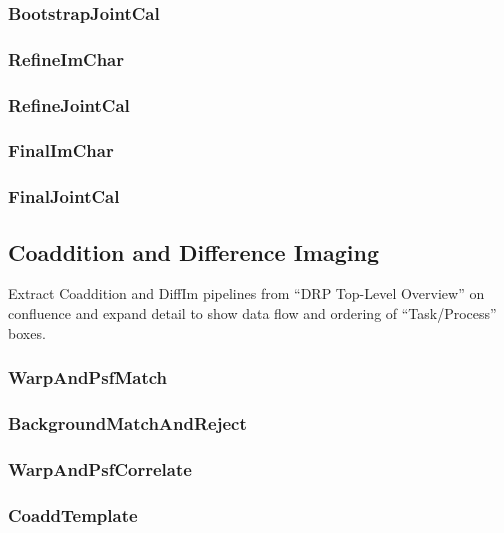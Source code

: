 \subsubsection{BootstrapJointCal}
\label{sec:drpBootstrapJointCal}
\subsubsection{RefineImChar}
\label{sec:drpRefineImChar}
\subsubsection{RefineJointCal}
\label{sec:drpRefineJointCal}
\subsubsection{FinalImChar}
\label{sec:drpFinalImChar}
\subsubsection{FinalJointCal}
\label{sec:drpFinalJointCal}

\subsection{Coaddition and Difference Imaging}
\label{sec:drp_coaddition_and_diffim}

\begin{note}
Extract Coaddition and DiffIm pipelines from ``DRP Top-Level Overview'' on confluence and expand detail to show data flow and ordering of ``Task/Process'' boxes.
\end{note}

\subsubsection{WarpAndPsfMatch}
\label{sec:drpWarpAndPsfMatch}
\subsubsection{BackgroundMatchAndReject}
\label{sec:drpBackgroundMatchAndReject}
\subsubsection{WarpAndPsfCorrelate}
\label{sec:drpWarpAndPsfCorrelate}
\subsubsection{CoaddTemplate}
\label{sec:drpCoaddTemplate}
